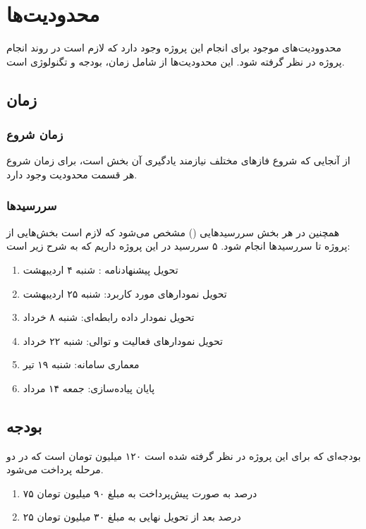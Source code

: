 \chapter{محدودیت‌ها}
محدوودیت‌های موجود برای انجام این پروژه وجود دارد که لازم است در روند انجام پروژه در نظر گرفته شود. این محدودیت‌ها از شامل زمان، بودجه و تگنولوژی است.
\section{زمان}
\subsection{زمان شروع}
از آنجایی که شروع فاز‌های مختلف نیاز‌مند یادگیری آن بخش است، برای زمان شروع هر قسمت محدودیت وجود دارد.
\subsection{سررسیدها}
همچنین در هر بخش سررسید‌هایی
()
مشخص می‌شود که لازم است بخش‌هایی از پروژه تا سررسید‌ها انجام شود. 
۵ سررسید در این پروژه داریم که به شرح زیر است:
\begin{enumerate}
	\item 
	تحویل پیشنهادنامه : شنبه ۴ اردیبهشت
	\item 
	تحویل نمودارهای مورد کاربرد: شنبه ۲۵ اردیبهشت
	\item 
	تحویل نمودار داده رابطه‌ای: شنبه ۸ خرداد
	\item
	تحویل نمودارهای فعالیت و توالی: شنبه ۲۲ خرداد
	\item
	معماری سامانه: شنبه ۱۹ تیر
	\item
	پایان پیاده‌سازی: جمعه  ۱۴ مرداد
\end{enumerate}

\section{بودجه}
بودجه‌ای که برای این پروژه در نظر گرفته شده است ۱۲۰ میلیون تومان است که در دو مرحله پرداخت می‌شود.
\begin{enumerate}
	\item 
	۷۵ درصد به صورت پیش‌پرداخت به مبلغ ۹۰ میلیون تومان
	\item 
	۲۵ درصد بعد از تحویل نهایی به مبلغ ۳۰ میلیون تومان
\end{enumerate}

